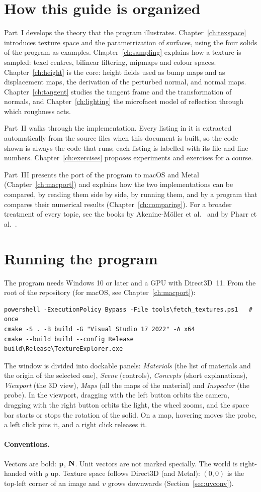 \section*{How this guide is organized}

Part~I develops the theory that the program illustrates. Chapter~\ref{ch:texspace}
introduces texture space and the parametrization of surfaces, using the four solids of the
program as examples. Chapter~\ref{ch:sampling} explains how a texture is sampled: texel
centres, bilinear filtering, mipmaps and colour spaces. Chapter~\ref{ch:height} is the core:
height fields used as bump maps and as displacement maps, the derivation of the perturbed
normal, and normal maps. Chapter~\ref{ch:tangent} studies the tangent frame and the
transformation of normals, and Chapter~\ref{ch:lighting} the microfacet model of reflection
through which roughness acts.

Part~II walks through the implementation. Every listing in it is extracted automatically
from the source files when this document is built, so the code shown is always the code that
runs; each listing is labelled with its file and line numbers. Chapter~\ref{ch:exercises}
proposes experiments and exercises for a course.

Part~III presents the port of the program to macOS and Metal (Chapter~\ref{ch:macport}) and
explains how the two implementations can be compared, by reading them side by side, by running
them, and by a program that compares their numerical results (Chapter~\ref{ch:comparing}).
For a broader treatment of every topic, see
the books by Akenine-M\"oller et al.\ \cite{akenine2018} and by Pharr et al.\ \cite{pharr2016}.

\section*{Running the program}

The program needs Windows 10 or later and a GPU with Direct3D~11. From the root of the
repository (for macOS, see Chapter~\ref{ch:macport}):

\begin{lstlisting}[language={},numbers=none,frame=none,basicstyle=\ttfamily\small]
powershell -ExecutionPolicy Bypass -File tools\fetch_textures.ps1   # once
cmake -S . -B build -G "Visual Studio 17 2022" -A x64
cmake --build build --config Release
build\Release\TextureExplorer.exe
\end{lstlisting}

The window is divided into dockable panels: \emph{Materials} (the list of materials and the
origin of the selected one), \emph{Scene} (controls), \emph{Concepts} (short explanations),
\emph{Viewport} (the 3D view), \emph{Maps} (all the maps of the material) and
\emph{Inspector} (the probe). In the viewport, dragging with the left button orbits the
camera, dragging with the right button orbits the light, the wheel zooms, and the space bar
starts or stops the rotation of the solid. On a map, hovering moves the probe, a left click
pins it, and a right click releases it.

\paragraph{Conventions.} Vectors are bold: $\mathbf{p}$, $\mathbf{N}$. Unit vectors are not marked
specially. The world is right-handed with $y$ up. Texture space follows Direct3D (and Metal):
$(0,0)$ is the top-left corner of an image and $v$ grows downwards
(Section~\ref{sec:uvconv}).

